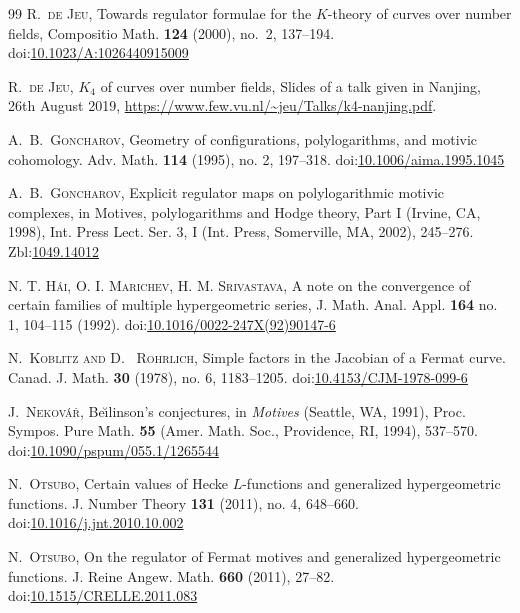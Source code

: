 \documentclass[11pt,a4,leqno]{amsart}
\theoremstyle{my theoremstyle}
\theoremstyle{dfn}
\theoremstyle{remark}
\renewcommand{\1}{\mathbbm{1}}
\numberwithin{equation}{section}
\begin{document}
\begin{thebibliography}{99}
\textsc{R.~de Jeu},
Towards regulator formulae for the $K$-theory of curves over number fields,
Compositio Math. \textbf{124} (2000), no.~2, 137--194. 
doi:\href{https://doi.org/10.1023/A:1026440915009}{10.1023/A:1026440915009}

\textsc{R.~de Jeu},
$K_4$ of curves over number fields,
Slides of a talk given in Nanjing, 26th August 2019, 
\url{https://www.few.vu.nl/~jeu/Talks/k4-nanjing.pdf}.

\textsc{A.~B.~Goncharov},
Geometry of configurations, polylogarithms, and motivic cohomology. Adv. Math. \textbf{114} (1995), no. 2, 197–318.
doi:\href{https://doi.org/10.1006/aima.1995.1045}{10.1006/aima.1995.1045}

\textsc{A.~B.~Goncharov},
Explicit regulator maps on polylogarithmic motivic complexes, in Motives, polylogarithms and Hodge theory, Part I (Irvine, CA, 1998), Int. Press Lect. Ser. 3, I (Int. Press, Somerville,
MA, 2002), 245–276. Zbl:\href{https://zbmath.org/1049.14012}{1049.14012} 

\textsc{N. T. H{\'a}i, O. I. Marichev, H. M. Srivastava}, 
A note on the convergence of certain families of multiple hypergeometric series, 
 J. Math. Anal. Appl. \textbf{164} no. 1, 104--115 (1992). 
 doi:\href{https://doi.org/10.1016/0022-247X(92)90147-6}{10.1016/0022-247X(92)90147-6}

\textsc{N.~Koblitz and D. ~Rohrlich},
Simple factors in the Jacobian of a Fermat curve.
Canad. J. Math. \textbf{30} (1978), no. 6, 1183--1205.
 doi:\href{https://doi.org/10.4153/CJM-1978-099-6}{10.4153/CJM-1978-099-6}

\textsc{J.~Nekov\'a\v r},
Be\u\i linson's conjectures,
in \emph{Motives} (Seattle, WA, 1991),
Proc. Sympos. Pure Math. \textbf{55} (Amer. Math. Soc., Providence, RI, 1994), 537--570.
doi:\href{https://doi.org/10.1090/pspum/055.1/1265544}{10.1090/pspum/055.1/1265544}

\textsc{N.~Otsubo},
Certain values of Hecke $L$-functions and generalized hypergeometric functions.
J. Number Theory \textbf{131} (2011), no. 4, 648--660.
doi:\href{https://doi.org/10.1016/j.jnt.2010.10.002}{10.1016/j.jnt.2010.10.002}

\textsc{N.~Otsubo},
On the regulator of Fermat motives and generalized hypergeometric functions.
J. Reine Angew. Math. {\bf 660} (2011), 27--82.
doi:\href{https://doi.org/10.1515/CRELLE.2011.083}{10.1515/CRELLE.2011.083}


\end{thebibliography}
\end{document}
